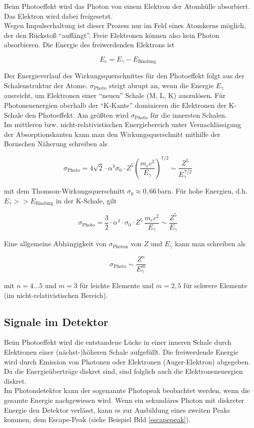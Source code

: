 Beim Photoeffekt wird das Photon von einem Elektron der Atomhülle absorbiert. Das Elektron wird
dabei freigesetzt.
\\
Wegen Impulserhaltung ist dieser Prozess nur im Feld eines Atomkerns möglich, der den Rückstoß 
"`auffängt"'. Freie Elektronen können also kein Photon absorbieren. Die Energie des freiwerdenden
Elektrons ist

\[ E_e=E_\gamma - E_{\text{Bindung}} \]

Der Energieverlauf des Wirkungsquerschnittes für den Photoeffekt folgt aus der Schalenstruktur der
Atome. $\sigma_\text{Photo}$ steigt abrupt an, wenn die Energie $E_\gamma$ ausreicht, um Elektronen
einer "`neuen"' Schale (M, L, K) auszulösen. Für Photonenenergien oberhalb der "`K-Kante"'
dominieren die Elektronen der K-Schale den Photoeffekt. Am größten wird $\sigma_\text{Photo}$ für
die innersten Schalen.
\\
Im mittleren bzw. nicht-relativistischen Energiebereich unter Vernachlässigung der Absorptionskanten
kann man den Wirkungsquerschnitt mithilfe der Bornschen Näherung schreiben als

\[ \sigma_\text{Photo} = 4\sqrt{2} \cdot \alpha^4 \sigma_0 \cdot Z^5 \left(\frac{m_ec^2}{E_\gamma}
\right)^{7/2} \sim \frac{Z^5}{E_\gamma^{\,7/2}} \]

mit dem Thomson-Wirkungsquerschnitt $\sigma_0\approx 0{,}66\,$barn. Für hohe Energien, d.h.
$E_\gamma>>E_{\text{Bindung}}$ in der K-Schale, gilt

\[\sigma_\text{Photo} = \frac{3}{2} \cdot \alpha^4 \cdot\sigma_0 \cdot Z^5\,
\frac{m_ec^2}{E_\gamma} \sim \frac{Z^5}{E_\gamma} \]

Eine allgemeine Abhängigkeit von $\sigma_\text{Photon}$ von $Z$ und $E_\gamma$ kann man schreiben
als

\[ \sigma_\text{Photo} \sim \frac{Z^n}{E_\gamma^m} \]

mit $n=4\ldots5$ und $m=3$ für leichte Elemente und $m=2{,}5$ für schwere Elemente (im
nicht-relativistischen Bereich).

\subsection*{Signale im Detektor}

Beim Photoeffekt wird die entstandene Lücke in einer inneren Schale durch Elektronen einer
(nächst-)höheren Schale aufgefüllt. Die freiwerdende Energie wird durch Emission von Photonen oder
Elektronen (Auger-Elektron) abgegeben. Da die Energieüberträge diskret sind, sind folglich auch die
Elektronenenergien diskret. 
\\
Im Photondetektor kann der sogenannte Photopeak beobachtet werden, wenn die gesamte Energie
nachgewiesen wird.  Wenn ein sekundäres Photon mit diskreter Energie den Detektor verlässt, kann
es zur Ausbildung eines zweiten Peaks kommen, dem Escape-Peak (siehe Beispiel Bild
\ref{escapepeak}).

